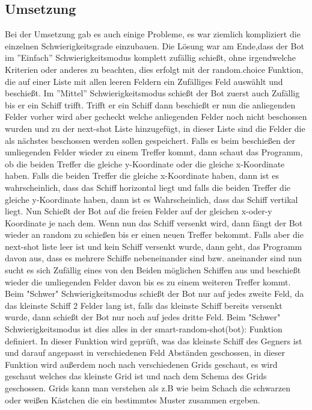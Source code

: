 \documentclass{article}
\begin{document}
\subsection{Umsetzung}
\par
    Bei der Umsetzung gab es auch einige Probleme, es war ziemlich kompliziert die einzelnen Schwierigkeitsgrade einzubauen. Die Lösung war am Ende,dass der Bot im  ''Einfach'' Schwierigkeitsmodus komplett zufällig schießt, ohne irgendwelche Kriterien oder anderes zu beachten, dies erfolgt mit der random.choice Funktion, die auf einer Liste mit allen leeren Feldern ein Zufälliges Feld  auswählt und beschießt. Im ''Mittel'' Schwierigkeitsmodus schießt der Bot zuerst auch Zufällig bis er ein Schiff trifft. Trifft er ein Schiff dann beschießt er nun die anliegenden Felder vorher wird aber gecheckt welche anliegenden Felder noch nicht beschossen wurden und zu der next-shot Liste hinzugefügt, in dieser Liste sind die Felder die als nächstes beschossen werden sollen gespeichert. Falls es beim beschießen der umliegenden Felder wieder zu einem Treffer kommt, dann schaut das Programm, ob die beiden Treffer die gleiche y-Koordinate oder die gleiche x-Koordinate haben. Falls die beiden Treffer die gleiche x-Koordinate haben, dann ist es wahrscheinlich, dass das Schiff horizontal liegt und falls die beiden Treffer die gleiche y-Koordinate haben, dann ist es Wahrscheinlich, dass das Schiff vertikal liegt. Nun Schießt der Bot auf die freien Felder auf der gleichen x-oder-y Koordinate je nach dem. Wenn nun das Schiff versenkt wird, dann fängt der Bot wieder an random zu schießen bis er einen neuen Treffer bekommt. Falls aber die next-shot liste leer ist und kein Schiff versenkt wurde, dann geht, das Programm davon aus, dass es mehrere Schiffe nebeneinander sind bzw. aneinander sind nun sucht es sich Zufällig eines von den Beiden möglichen Schiffen aus und beschießt wieder die umliegenden Felder davon bis es zu einem weiteren Treffer kommt. Beim "Schwer" Schwierigkeitsmodus schießt der Bot nur auf jedes zweite Feld, da das kleinste Schiff 2 Felder lang ist, falls das kleinste Schiff bereits versenkt wurde, dann schießt der Bot nur noch auf jedes dritte Feld. Beim "Schwer" Schwierigkeitsmodus ist dies alles in der smart-random-shot(bot): Funktion definiert. In dieser Funktion wird geprüft, was das kleinste Schiff des Gegners ist und darauf angepasst in verschiedenen Feld Abständen geschossen, in dieser Funktion wird außerdem noch nach verschiedenen Grids geschaut, es wird geschaut welches das kleinste Grid ist und nach dem Schema des Grids geschossen. Grids kann man verstehen als z.B wie beim Schach die schwarzen oder weißen Kästchen die ein bestimmtes Muster zusammen ergeben.
\end{document}
